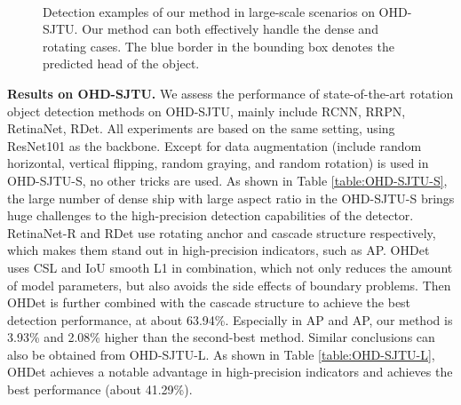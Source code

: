 \documentclass[10pt,journal,compsoc]{IEEEtran}
\begin{document}
\begin{figure*}[tb!]
	\centering
	 \\
	\centering
	\vspace{-8pt}
	\caption{Detection examples of our  method in large-scale scenarios on OHD-SJTU. Our method can both effectively handle the dense and rotating cases. The blue border in the bounding box denotes the predicted head of the object.}
	\label{fig:head_vis}
\end{figure*}

\noindent \textbf{Results on OHD-SJTU.}
We assess the performance of state-of-the-art rotation object detection methods on OHD-SJTU, mainly include RCNN, RRPN, RetinaNet, RDet.
All experiments are based on the same setting, using ResNet101 as the backbone. Except for data augmentation (include random horizontal, vertical flipping, random graying, and random rotation) is used in OHD-SJTU-S, no other tricks are used. As shown in Table \ref{table:OHD-SJTU-S}, the large number of dense ship with large aspect ratio in the OHD-SJTU-S brings huge challenges to the high-precision detection capabilities of the detector. RetinaNet-R and RDet use rotating anchor and cascade structure respectively, which makes them stand out in high-precision indicators, such as AP. OHDet uses CSL and IoU smooth L1 in combination, which not only reduces the amount of model parameters, but also avoids the side effects of boundary problems. Then OHDet is further combined with the cascade structure to achieve the best detection performance, at about 63.94\%.
Especially in AP and AP, our method is 3.93\% and 2.08\% higher than the second-best method. Similar conclusions can also be obtained from OHD-SJTU-L. As shown in Table \ref{table:OHD-SJTU-L}, OHDet achieves a notable advantage in high-precision indicators and achieves the best performance (about 41.29\%).
\end{document}
